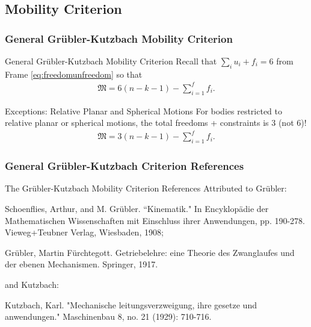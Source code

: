 \subsection{Mobility Criterion}
\begin{frame}
	\frametitle{ General Gr{\"u}bler-Kutzbach Mobility Criterion}	
	\begin{block}{ General Gr{\"u}bler-Kutzbach Mobility Criterion}
		Recall that $\sum_i u_i + f_i = 6$ from Frame \eqref{eq:freedomunfreedom} so that 
		\begin{align}
			\mathfrak{M}=6(n-k-1) - \sum_{i=1}^{f}f_i.
			\label{grubler}
		\end{align}
	\end{block}
	
	\begin{block}{Exceptions: Relative Planar and Spherical Motions}
		For bodies restricted to relative planar or spherical  motions, the total freedoms + constraints is 3 (not 6)! %
		\begin{align}
			\mathfrak{M}=3(n-k-1) - \sum_{i=1}^{f}f_i.
			\label{grubler}
		\end{align}
	\end{block}
\end{frame}

\begin{frame}
	\frametitle{ General Gr{\"u}bler-Kutzbach Criterion References}
		
	\begin{block}{The Gr{\"u}bler-Kutzbach Mobility Criterion References}
		Attributed to Gr{\"u}bler: 
		\begin{description}
			\item \footnotesize{Schoenflies, Arthur, and M. Grübler. ``Kinematik." In Encyklopädie der Mathematischen Wissenschaften mit Einschluss ihrer Anwendungen, pp. 190-278. Vieweg+Teubner Verlag, Wiesbaden, 1908};
			\item \footnotesize{Grübler, Martin Fürchtegott. Getriebelehre: eine Theorie des Zwanglaufes und der ebenen Mechanismen. Springer, 1917}.
		\end{description}
	and Kutzbach:
		\begin{description}
			\item \footnotesize{Kutzbach, Karl. "Mechanische leitungsverzweigung, ihre gesetze und anwendungen." Maschinenbau 8, no. 21 (1929): 710-716.}
		\end{description}
	\end{block}
\end{frame}

